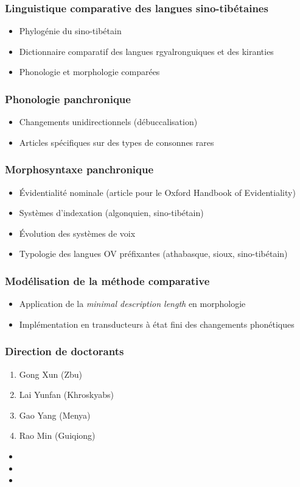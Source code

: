 \documentclass[xcolor=table]{beamer}
\begin{document}
   \begin{frame} 
 \frametitle{Linguistique comparative des langues sino-tibétaines} 
 \begin{itemize}%
 \item Phylogénie du sino-tibétain
  \item Dictionnaire comparatif des langues rgyalronguiques et des kiranties
  \item Phonologie et morphologie comparées
\end{itemize}
   \end{frame} 

   \begin{frame} 
 \frametitle{Phonologie panchronique} 
 \begin{itemize}%
 \item Changements unidirectionnels (débuccalisation)
 \item Articles spécifiques sur des types de consonnes rares
\end{itemize}
   \end{frame} 

   \begin{frame} 
 \frametitle{Morphosyntaxe panchronique} 
 \begin{itemize}%
 \item Évidentialité nominale (article pour le Oxford Handbook of Evidentiality)
 \item Systèmes d'indexation (algonquien, sino-tibétain)
 \item Évolution des systèmes de voix
 \item Typologie des langues OV préfixantes (athabasque, sioux, sino-tibétain)
\end{itemize}
   \end{frame} 

   \begin{frame} 
 \frametitle{Modélisation de la méthode comparative} 
 \begin{itemize}%
 \item Application de la \textit{minimal description length} en morphologie
 \item  Implémentation en transducteurs à état fini des changements phonétiques
\end{itemize}
   \end{frame} 

  \begin{frame} 
 \frametitle{Direction de doctorants} 

\begin{enumerate}
\item Gong Xun (Zbu)
\item Lai Yunfan (Khroskyabs)
\item Gao Yang (Menya)
\item Rao Min (Guiqiong)
\end{enumerate}

\begin{itemize}
\item  {}
\item  {}  
\item  {}
\end{itemize}   
  \end{frame}   
\end{document}
